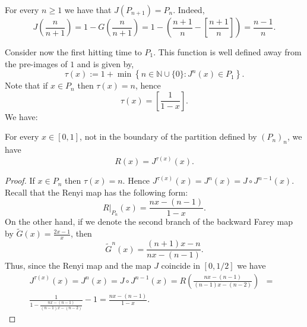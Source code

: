 \documentclass[letterpaper,10pt,reqno]{amsart}
\numberwithin{equation}{section}     %
\newcommand{\N}{\mathbb{N}}
\def\N{{\mathbb N}}
\begin{document}
\begin{remark}
For every $n \geq 1$ we have that $J(P_{n+1})= P_n$. Indeed,
\begin{equation*}
J\left( \frac{n}{n+1}\right) = 1 - G\left( \frac{n}{n+1}\right) =
1 - \left( \frac{n+1}{n} -\left[ \frac{n+1}{n}\right] \right)  = \frac{n-1}{n}.
\end{equation*} 
\end{remark}
 
Consider now the first hitting time to $P_1$. This function is well defined away from the pre-images of $1$ and is given by,
\begin{equation*}
\tau(x):= 1 + \min \left\{n \in \N \cup\{0\} : 	J^n(x) \in P_1	\right\}.
\end{equation*}
Note that if $x \in P_n$ then $\tau(x)= n$, hence
\begin{equation*}
\tau(x)= \left[\frac{1}{1-x}	\right].
\end{equation*}
We have:

\begin{lemma}
For every $x \in [0,1]$, not in the boundary  of the partition defined by $(P_n)_n$, we have
\begin{equation*}
R(x)= J^{\tau(x)}(x).
\end{equation*}
\end{lemma}

\begin{proof}
If $x \in P_n$ then $\tau(x)=n$. Hence $J^{\tau(x)}(x)= J^n(x)=J \circ J^{n-1}(x)$.
Recall that the Renyi map has the following form:
\begin{equation*}
R|_{P_n}(x)= \frac{nx- (n-1)}{1-x}.
\end{equation*}
On the other hand, if we denote the second branch of the backward Farey map by $\tilde{G}(x)=\frac{2x-1}{x}$, then
\begin{equation*} 
\tilde{G}^n(x)= \frac{(n+1)x -n}{nx-(n-1)}.
\end{equation*}
Thus, since the Renyi map and the map $J$ coincide in $[0, 1/2]$ we have
\begin{eqnarray*}
J^{\tau(x)}(x)= J^n(x)=J \circ J^{n-1}(x)= R\left( \frac{nx -(n-1)}{(n-1)x-(n-2)} \right) &=& \\ \frac{1}{1- \frac{nx -(n-1)}{(n-1)x-(n-2)}	} -1= \frac{nx -(n-1)}{1-x}.
\end{eqnarray*}
\end{proof}

\end{document}
